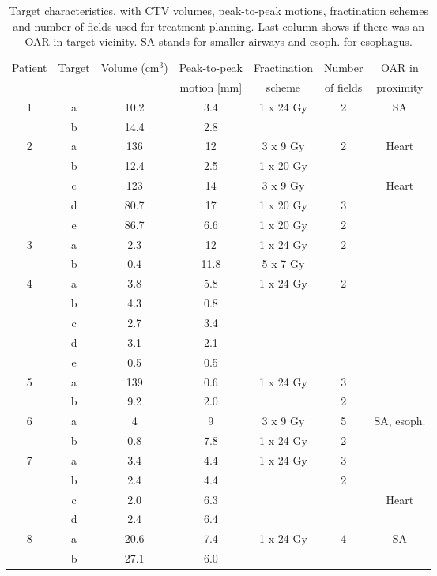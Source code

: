 \documentclass[type=dr, dr=rernat, accentcolor=tud7b,colorbacktitle, bigchapter, openright, twoside, 12pt ]{tudthesis}
\begin{document}
\begin{table}[H]
	\centering
	\caption{Target characteristics, with CTV volumes, peak-to-peak motions, fractination schemes and number of fields used for treatment planning. Last column 
	shows if there was an OAR in target vicinity. SA stands for smaller airways and esoph. for esophagus.}
	\begin{tabular}{c|c|c|c|c|c|c}
		\hline\hline
		\multirow{2}{*}{Patient} & \multirow{2}{*}{Target} & \multirow{2}{*}{Volume (cm$^3$)} & Peak-to-peak & Fractination & Number & OAR in \\
		 & & & motion [mm] & scheme & of fields & proximity \\
		\hline
		\multirow{2}{*}{1} & a & 10.2 & 3.4  & \multirow{2}{*}{1 x 24 Gy} & \multirow{2}{*}{2} & \multirow{2}{*}{SA} \\
		 & b & 14.4 & 2.8 &  &  &  \\
		 
		 \hline
		 \multirow{5}{*}{2} & a & 136 & 12  & 3 x 9 Gy & \multirow{3}{*}{2} & Heart\\
		  & b & 12.4 & 2.5  & 1 x 20 Gy &  &\\
		  & c & 123 & 14  & 3 x 9 Gy &  &Heart \\
		 & d & 80.7 & 17  & 1 x 20 Gy & 3  &\\
		 & e & 86.7 & 6.6  & 1 x 20 Gy & 2 & \\
		 \hline
		 \multirow{2}{*}{3} & a & 2.3 & 12  & 1 x 24 Gy & \multirow{2}{*}{2} \\
		 & b & 0.4 & 11.8  & 5 x 7 Gy &  \\
		 \hline
		 \multirow{5}{*}{4} & a & 3.8 & 5.8  & \multirow{5}{*}{1 x 24 Gy} & \multirow{5}{*}{2} \\
		  & b & 4.3 & 0.8  &  & \\
		  & c & 2.7 & 3.4  &  & \\
		  & d & 3.1 & 2.1  &  & \\
		  & e & 0.5 & 0.5  &  & \\
		  \hline
		  \multirow{2}{*}{5} & a & 139 & 0.6 & \multirow{2}{*}{1 x 24 Gy} & 3 \\
		 & b & 9.2 & 2.0  &  & 2 \\
		 \hline
		 \multirow{2}{*}{6} & a & 4 & 9  & 3 x 9 Gy  & 5 & SA, esoph. \\
		 & b & 0.8 & 7.8  & 1 x 24 Gy & 2 \\
		 \hline
		 \multirow{4}{*}{7} & a & 3.4   & 4.4    & \multirow{4}{*}{1 x 24 Gy} & 3  \\
				    & b & 2.4 & 4.4  & & \multirow{3}{*}{2} \\
				    & c & 2.0 & 6.3  & & & \multirow{2}{*}{Heart}\\
				    & d & 2.4 & 6.4  & & \\
		\hline	    
		\multirow{2}{*}{8} & a & 20.6 & 7.4 & \multirow{2}{*}{1 x 24 Gy} & \multirow{2}{*}{4} & \multirow{2}{*}{SA}  \\
		 & b & 27.1 & 6.0  &  &   \\
		 

\end{tabular}
\end{table}
\end{document}
